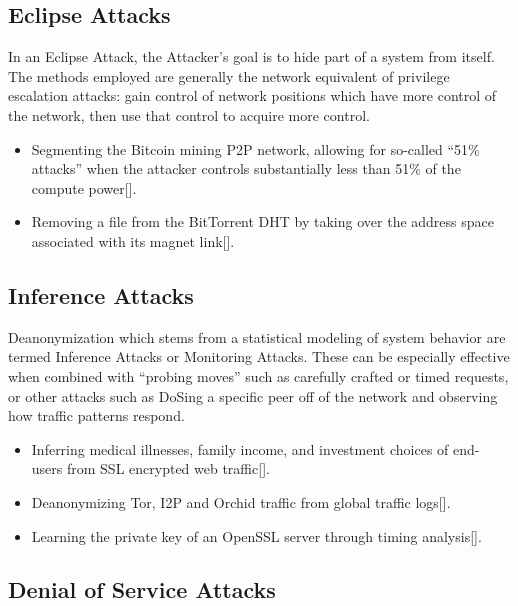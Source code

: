 \documentclass{article}
\newcommand{\mesh}{Orchid}
\begin{document}
\subsection{Eclipse Attacks}

In an Eclipse Attack, the Attacker's goal is to hide part of a system from itself. The methods employed are generally the network equivalent of privilege escalation attacks: gain control of network positions which have more control of the network, then use that control to acquire more control.

\begin{itemize}
\item Segmenting the Bitcoin mining P2P network, allowing for so-called “51\% attacks” when the attacker controls substantially less than 51\% of the compute power[\cite{bitcoinEclipse}].
\item Removing a file from the BitTorrent DHT by taking over the address space associated with its magnet link[\cite{bittorrentSybilAttacks}].
\end{itemize}

\subsection{Inference Attacks}
\label{inference-attacks}

Deanonymization which stems from a statistical modeling of system behavior are termed Inference Attacks or Monitoring Attacks. These can be especially effective when combined with “probing moves” such as carefully crafted or timed requests, or other attacks such as DoSing a specific peer off of the network and observing how traffic patterns respond.

\begin{itemize}
\item Inferring medical illnesses, family income, and investment choices of end- users from SSL encrypted web traffic[\cite{broadInferenceAttacks}].
\item Deanonymizing Tor, I2P and \mesh{} traffic from global traffic logs[\cite{mixTrafficAnalysis}].
\item Learning the private key of an OpenSSL server through timing analysis[\cite{opensslTimingAttack}].
\end{itemize}

\subsection{Denial of Service Attacks}
\end{document}
